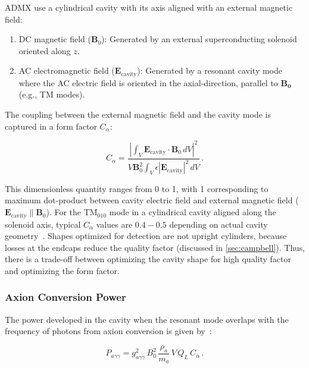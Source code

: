     \noindent ADMX use a cylindrical cavity with its axis aligned with an external magnetic field:
    
    \begin{enumerate}
        \item DC magnetic field ($\mathbf{B}_{\text{0}}$): Generated by an external superconducting solenoid oriented along $z$.
        \item AC electromagnetic field ($\mathbf{E}_{\text{cavity}}$): Generated by a resonant cavity mode where the AC electric field is oriented in the axial-direction, parallel to $\mathbf{B_0}$ (e.g., TM modes).
    \end{enumerate} 

    The coupling between the external magnetic field and the cavity mode is captured in a form factor $C_\alpha$:
        
    \begin{equation}
        C_\alpha = \frac{\left| \int_V \mathbf{E}_{\text{cavity}} \cdot \mathbf{B}_0 \, dV \right|^2}{V \mathbf{B}_0^2 \int_V \epsilon |\mathbf{E}_{\text{cavity}}|^2 \, dV} \, .
        \label{eq:formfactor}
    \end{equation}
    
    \noindent This dimensionless quantity ranges from 0 to 1, with 1 corresponding to maximum dot-product between cavity electric field and external magnetic field ($\mathbf{E}_{\text{cavity}} \parallel \mathbf{B}_0$). For the TM$_{010}$ mode in a cylindrical cavity aligned along the solenoid axis, typical $C_\alpha$ values are $0.4-0.5$ depending on actual cavity  geometry~\cite{Braine:2024nzi}. Shapes optimized for detection are not upright cylinders, because losses at the endcaps reduce the quality factor (discussed in \ref{sec:campbell}). Thus, there is a trade-off between optimizing the cavity shape for high quality factor and optimizing the form factor.

    \subsubsection{Axion Conversion Power}

    The power developed in the cavity when the resonant mode overlaps with the frequency of photons from axion conversion is given by~\cite{ADMX:2018gho}:


    \begin{equation}
        P_{a\gamma\gamma} = g_{a\gamma\gamma}^2 \,  B_{0}^2 \, \frac{\rho_a}{m_a} \, V\,  Q_{L}\, C_{\alpha} \,.\label{eq:FullPower1}  
    \end{equation}

